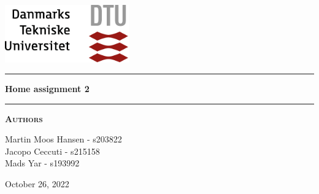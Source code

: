 
\begin{titlepage}
\begin{center}
\vspace{2cm}
\includegraphics[width=0.4\textwidth]{root/dtu.png}~\\[1cm]
\vspace{2cm}

\vspace{2cm}

\hrule
\vspace{.5cm}
{ \huge \bfseries Home assignment 2 } %
\vspace{.5cm}

\hrule
\vspace{1.5cm}

\textsc{\textbf{Authors}}\\
\vspace{.5cm}
\centering

Martin Moos Hansen - s203822\\
Jacopo Ceccuti - s215158\\
Mads Yar - s193992\\

\vspace{4cm}

\centering October 26, 2022%
\end{center}
\end{titlepage}